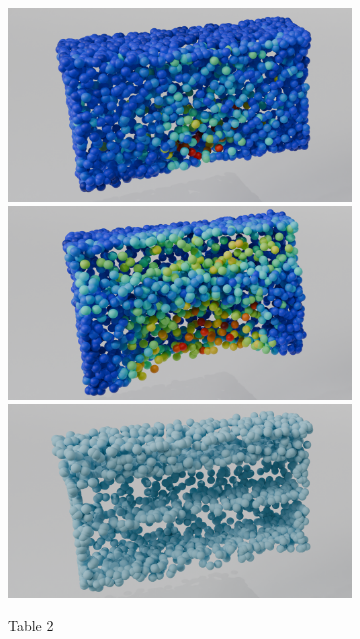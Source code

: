 \begin{figure}[htb]
\begin{subfigure}[t]{0.315\textwidth}
            \includegraphics[width=\textwidth]{figures/ens_lin_t2.png}
            \includegraphics[width=\textwidth]{figures/iml_lin_t2.png}
            \includegraphics[width=\textwidth]{figures/com_t2.png}
            \caption{Table 2}
          \end{subfigure}\hfill
          \begin{subfigure}[t]{0.315\textwidth}

\end{subfigure}
\end{figure}

